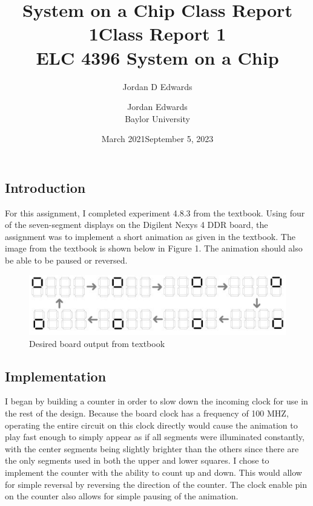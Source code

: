 \documentclass{article}
\title{System on a Chip Class Report 1}
\author{Jordan D Edwards}
\date{March 2021}
\begin{document}
	
	\title{Class Report 1
		\\ \large{ELC 4396 System on a Chip}  }
	
	\author{Jordan Edwards \\ Baylor University} %
	\date{September 5, 2023}
	\maketitle
	
	\subsection*{Introduction}
		For this assignment, I completed experiment 4.8.3 from the textbook. Using four of the seven-segment displays on the Digilent Nexys 4 DDR board, the assignment was to implement a short animation as given in the textbook. The image from the textbook is shown below in Figure 1. The animation should also be able to be paused or reversed.
		
		\begin{figure}[H]
			\centering
			\includegraphics[width=0.7\linewidth]{"SOC 4.8.3 book diagram"}
			\caption{Desired board output from textbook}
			\label{fig:bookPic}
		\end{figure}
		
	
	\subsection*{Implementation}
	I began by building a counter in order to slow down the incoming clock for use in the rest of the design. Because the board clock has a frequency of 100 MHZ, operating the entire circuit on this clock directly would cause the animation to play fast enough to simply appear as if all segments were illuminated constantly, with the center segments being slightly brighter than the others since there are the only segments used in both the upper and lower squares. I chose to implement the counter with the ability to count up and down. This would allow for simple reversal by reversing the direction of the counter. The clock enable pin on the counter also allows for simple pausing of the animation.
	
\end{document}
